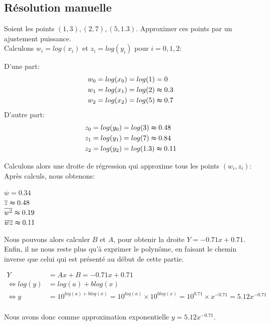 \subsection{Résolution manuelle}
Soient les points $(1,3), (2,7), (5, 1.3)$. Approximer ces points par un ajustement puissance.\\
Calculons $w_i=log(x_i)$ et $z_i=log(y_i)$ pour $i=0,1,2$:\\
\begin{center}
    D'une part: 
    \begin{align*}
        w_0&=log(x_0)=log(1)=0\\
        w_1&=log(x_1)=log(2)\thickapprox0.3\\
        w_2&=log(x_2)=log(5)\thickapprox 0.7\vspace{2pt}\\
    \end{align*}
    D'autre part: 
    \begin{align*}
        z_0&=log(y_0)=log(3)\thickapprox0.48\\
        z_1&=log(y_1)=log(7)\thickapprox0.84\\
        z_2&=log(y_2)=log(1.3)\thickapprox 0.11\vspace{2pt}\\
    \end{align*}
\end{center}
Calculons alors une droite de régression qui approxime tous les points $(w_i, z_i)$:\\
Après calculs, nous obtenons: \\
\begin{center}
    $\overline{w}=0.34$\vspace{3pt}\\
    $\overline{z}\thickapprox0.48$\vspace{3pt}\\
    $\overline{w^2}\thickapprox0.19$\vspace{3pt}\\
    $\overline{wz}\thickapprox0.11$\vspace{3pt}\\
\end{center}
Nous pouvons alors calculer $B$ et $A$, pour obtenir la droite $Y=-0.71x+0.71$.
Enfin, il ne nous reste plus qu'à exprimer le polynôme, en faisant le chemin inverse que celui qui est présenté au début de cette partie.\\
\begin{center}
    \begin{align*}
        Y&=Ax+B=-0.71x+0.71\\
        \Leftrightarrow log(y)&=log(a)+blog(x)\\
        \Leftrightarrow y&=10^{log(a)+blog(x)}=10^{log(a)}\times 10^{blog(x)}=10^{0.71}\times x^{-0.71}=5.12x^{-0.71}\\
    \end{align*}
\end{center}
Nous avons donc comme approximation exponentielle $y=5.12x^{-0.71}$.
\newpage
